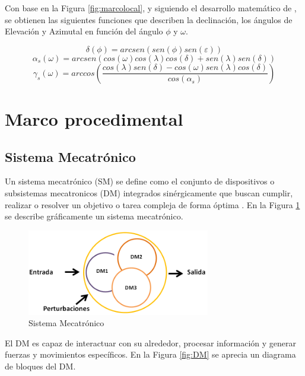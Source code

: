 Con base en la Figura \ref{fig:marcolocal}, y siguiendo el desarrollo matemático de \cite{M10}, se obtienen las siguientes funciones que describen la declinación, los ángulos de Elevación y Azimutal en función del ángulo $ \phi $ y $ \omega $.

\begin{equation}\label{eq:delta}
\delta(\phi)=arcsen(sen(\phi)sen(\varepsilon))
\end{equation}
\begin{equation}\label{eq:alfa}
\alpha_s(\omega) = arcsen(cos(\omega)cos(\lambda)cos(\delta) + sen(\lambda)sen(\delta))
\end{equation}
\begin{equation}\label{eq:zeta}
\gamma_s(\omega )= arccos\left( \frac{cos(\lambda)sen(\delta) - cos(\omega)sen(\lambda)cos(\delta)}{cos(\alpha_s)}\right) 
\end{equation}

\newpage
\section{Marco procedimental}

\subsection{Sistema Mecatrónico}
Un sistema mecatrónico (SM) se define como el conjunto de dispositivos o subsistemas mecatronicos (DM) integrados sinérgicamente que buscan cumplir, realizar o resolver un objetivo o tarea compleja de forma óptima \cite{I5:2019:Online}. En la Figura \ref{fig:SM} se describe gráficamente un sistema mecatrónico.

\begin{figure}[H]
	\centering
	\includegraphics[width=8cm]{imagenes/SM}
	\caption{Sistema Mecatrónico}
	\label{fig:SM}
\end{figure}

El DM es capaz de interactuar con su alrededor, procesar información y generar fuerzas y movimientos específicos. En la Figura \ref{fig:DM} se aprecia un diagrama de bloques del DM.

